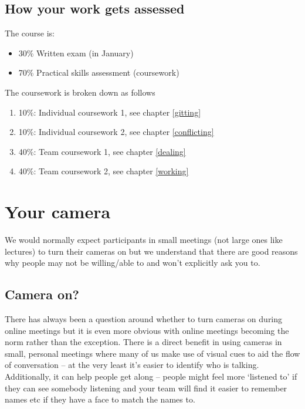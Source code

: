 \documentclass[
]{book}
\providecommand{\tightlist}{%
  \setlength{\itemsep}{0pt}\setlength{\parskip}{0pt}}
\begin{document}
\hypertarget{assessment}{%
\subsection{How your work gets assessed}\label{assessment}}

The course is:

\begin{itemize}
\tightlist
\item
  30\% Written exam (in January)
\item
  70\% Practical skills assessment (coursework)
\end{itemize}

The coursework is broken down as follows

\begin{enumerate}
\def\labelenumi{\arabic{enumi}.}
\tightlist
\item
  10\%: Individual coursework 1, see chapter \ref{gitting}
\item
  10\%: Individual coursework 2, see chapter \ref{conflicting}
\item
  40\%: Team coursework 1, see chapter \ref{dealing}
\item
  40\%: Team coursework 2, see chapter \ref{working}
\end{enumerate}

\hypertarget{cameras}{%
\section{Your camera}\label{cameras}}

We would normally expect participants in small meetings (not large ones like lectures) to turn their cameras on but we understand that there are good reasons why people may not be willing/able to and won't explicitly ask you to.

\hypertarget{on}{%
\subsection{Camera on?}\label{on}}

There has always been a question around whether to turn cameras on during online meetings but it is even more obvious with online meetings becoming the norm rather than the exception. There is a direct benefit in using cameras in small, personal meetings where many of us make use of visual cues to aid the flow of conversation -- at the very least it's easier to identify who is talking. Additionally, it can help people get along -- people might feel more `listened to' if they can see somebody listening and your team will find it easier to remember names etc if they have a face to match the names to.
\end{document}
